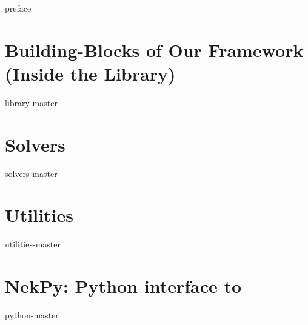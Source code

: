 \tableofcontents

{preface}


%

%

\part{Building-Blocks of Our Framework (Inside the Library)} \label{part:library}


{library-master}
\part{Solvers} \label{part:solvers}

{solvers-master}

\part{Utilities} \label{part:utilities}

{utilities-master}

\part{NekPy: Python interface to \nek{}} \label{part:nekpy}

{python-master}



 

\printindex


